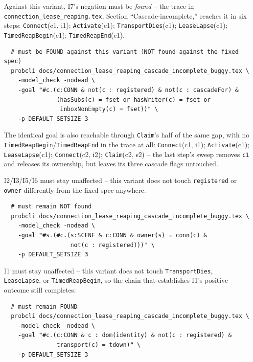 \documentclass[a4paper,10pt,fleqn]{article}
\begin{document}
Against this variant, I7's negation must be \emph{found} -- the trace in
\texttt{connection\_lease\_reaping.tex}, Section ``Cascade-incomplete,''
reaches it in six steps:
\texttt{Connect}(c1, i1); \texttt{Activate}(c1); \texttt{TransportDies}(c1);
\texttt{LeaseLapse}(c1); \texttt{TimedReapBegin}(c1); \texttt{TimedReapEnd}(c1).

\begin{verbatim}
  # must be FOUND against this variant (NOT found against the fixed spec)
  probcli docs/connection_lease_reaping_cascade_incomplete_buggy.tex \
    -model_check -nodead \
    -goal "#c.(c:CONN & not(c : registered) & not(c : cascadeFor) &
               (hasSubs(c) = fset or hasWriter(c) = fset or
                inboxNonEmpty(c) = fset))" \
    -p DEFAULT_SETSIZE 3
\end{verbatim}

The identical goal is also reachable through \texttt{Claim}'s half of the
same gap, with no \texttt{TimedReapBegin}/\texttt{TimedReapEnd} in the
trace at all:
\texttt{Connect}(c1, i1); \texttt{Activate}(c1); \texttt{LeaseLapse}(c1);
\texttt{Connect}(c2, i2); \texttt{Claim}(c2, s2) -- the last step's sweep
removes \texttt{c1} and releases its ownership, but leaves its three
cascade flags untouched.

I2/I3/I5/I6 must stay unaffected -- this variant does not touch
\texttt{registered} or \texttt{owner} differently from the fixed spec
anywhere:

\begin{verbatim}
  # must remain NOT found
  probcli docs/connection_lease_reaping_cascade_incomplete_buggy.tex \
    -model_check -nodead \
    -goal "#s.(#c.(s:SCENE & c:CONN & owner(s) = conn(c) &
                   not(c : registered)))" \
    -p DEFAULT_SETSIZE 3
\end{verbatim}

I1 must stay unaffected -- this variant does not touch
\texttt{TransportDies}, \texttt{LeaseLapse}, or \texttt{TimedReapBegin},
so the chain that establishes I1's positive outcome still completes:

\begin{verbatim}
  # must remain FOUND
  probcli docs/connection_lease_reaping_cascade_incomplete_buggy.tex \
    -model_check -nodead \
    -goal "#c.(c:CONN & c : dom(identity) & not(c : registered) &
               transport(c) = tdown)" \
    -p DEFAULT_SETSIZE 3
\end{verbatim}
\end{document}
